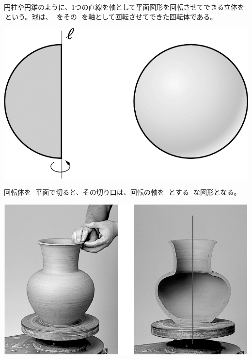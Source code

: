 \documentclass[
  12pt,a4paper,lualatex,ja=standard]{bxjsarticle}
\begin{document}
\begin{multicols}{2}
円柱や円錐のように、1つの直線を軸として平面図形を回転させてできる立体を\,  \,という。球は、\,  \,をその\,  \,を軸として回転させてできた回転体である。

\columnbreak

\begin{center}
\includegraphics{media/image104.png}
\end{center}
\end{multicols}

\begin{multicols}{2}
回転体を\,  \,平面で切ると、その切り口は、回転の軸を\,  \,とする\,  \,な図形となる。

\columnbreak

\begin{center}
\includegraphics{media/image105.png}
\end{center}
\end{multicols}
\end{document}

